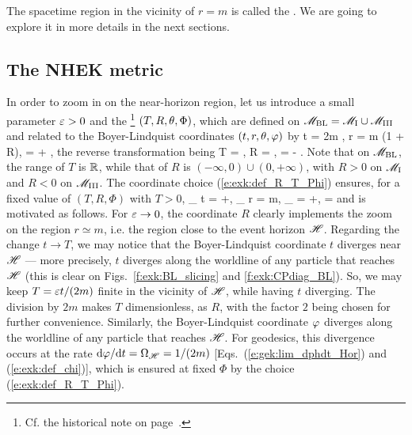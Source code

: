 The spacetime region in the vicinity of $r=m$ is called the
.
We are going to explore it in more details in the next sections.

\subsection{The NHEK metric} \label{s:exk:NHEK_metric}

In order to zoom in on the near-horizon region, let us introduce
a small parameter $\varepsilon >0$ and
the \footnote{Cf. the historical note on
page~\pageref{h:exk:NHEK_metric}.} $(T,R,\theta,\Phi)$, which are defined on $\mathscr{M}_{\rm BL} = \mathscr{M}_{\rm I} \cup \mathscr{M}_{\rm III}$
and related to the Boyer-Lindquist coordinates
$(t,r,\theta,\varphi)$ by
\be \label{e:exk:def_R_T_Phi}
    t = 2m ,\quad
    r = m (1 + \veps R),\quad
    \ph = \Phi +  ,
\ee
the reverse transformation being
\be \label{e:exk:R_T_Phi_BL}
    T = \veps {}, \quad
    R = , \quad
    \Phi = \ph -  .
\ee
Note that on $\mathscr{M}_{\rm BL}$, the range of $T$ is $\mathbb{R}$, while
that of $R$ is $(-\infty,0)\cup(0,+\infty)$, with $R>0$ on $\mathscr{M}_{\rm I}$
and $R<0$ on $\mathscr{M}_{\rm III}$.
The coordinate choice (\ref{e:exk:def_R_T_Phi}) ensures, for a fixed value of $(T,R,\Phi)$ with $T>0$,
\be
    \lim_{\veps{}} t = +\infty,\quad
    \lim_{\veps{}} r = m, \quad
    \lim_{\veps{}} \ph = +\infty,\quad
     = 
\ee
and is motivated as follows.
For $\varepsilon\to 0$,
the coordinate $R$ clearly implements the zoom on the region $r\simeq m$,
i.e. the region close to the event horizon $\mathscr{H}$.
Regarding the change $t\to T$, we may notice that the Boyer-Lindquist coordinate
$t$ diverges near  $\mathscr{H}$ --- more precisely,
$t$ diverges along the worldline of any particle that reaches $\mathscr{H}$
(this is clear on Figs.~\ref{f:exk:BL_slicing} and \ref{f:exk:CPdiag_BL}).
So, we may keep $T = \varepsilon t/(2m)$ finite in the vicinity of $\mathscr{H}$, while having
$t$ diverging. The division by $2m$ makes $T$ dimensionless, as $R$, with the
factor $2$ being chosen for further convenience.
Similarly, the Boyer-Lindquist coordinate $\varphi$ diverges along the worldline of any particle that reaches $\mathscr{H}$.
For geodesics, this divergence occurs at the rate $\mathrm{d}\varphi/\mathrm{d} t = \Omega_{\mathscr{H}} = 1/(2m)$
[Eqs.~(\ref{e:gek:lim_dphdt_Hor}) and (\ref{e:exk:def_chi})], which is ensured
at fixed $\Phi$ by the choice (\ref{e:exk:def_R_T_Phi}).

